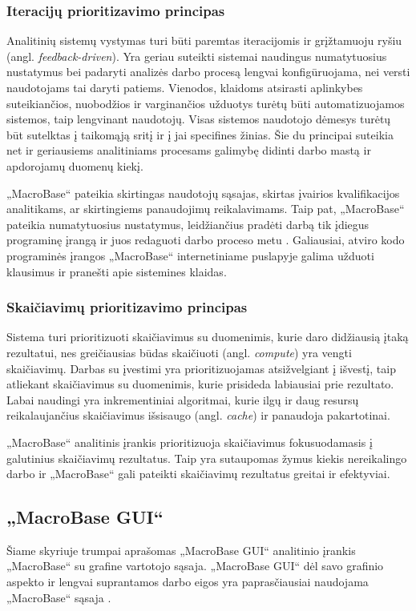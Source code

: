 \documentclass{VUMIFPSkursinis}
\begin{document}
\subsubsection{Iteracijų prioritizavimo principas}
Analitinių sistemų vystymas turi būti paremtas iteracijomis ir grįžtamuoju ryšiu (angl. \textit{feedback-driven}). Yra geriau  suteikti sistemai naudingus numatytuosius nustatymus bei padaryti analizės darbo procesą lengvai konfigūruojama, nei versti naudotojams tai daryti patiems. Vienodos, klaidoms atsirasti aplinkybes suteikiančios, nuobodžios ir varginančios užduotys turėtų būti automatizuojamos sistemos, taip lengvinant naudotojų. Visas sistemos naudotojo dėmesys turėtų būt sutelktas į taikomąją sritį ir į jai specifines žinias. Šie du principai suteikia net ir geriausiems analitiniams procesams galimybę didinti darbo mastą ir apdorojamų duomenų kiekį.\par

„MacroBase“ pateikia skirtingas naudotojų sąsajas, skirtas įvairios kvalifikacijos analitikams, ar skirtingiems panaudojimų reikalavimams. Taip pat, „MacroBase“ pateikia numatytuosius nustatymus, leidžiančius pradėti darbą tik įdiegus programinę įrangą ir juos redaguoti darbo proceso metu \cite{prioritizing_attention}. Galiausiai, atviro kodo programinės įrangos „MacroBase“ internetiniame puslapyje galima užduoti klausimus ir pranešti apie sistemines klaidas.

\subsubsection{Skaičiavimų prioritizavimo principas}
Sistema turi prioritizuoti skaičiavimus su duomenimis, kurie daro didžiausią įtaką rezultatui, nes greičiausias būdas skaičiuoti (angl. \textit{compute}) yra vengti skaičiavimų. Darbas su įvestimi yra prioritizuojamas atsižvelgiant į išvestį, taip atliekant skaičiavimus su duomenimis, kurie prisideda labiausiai prie rezultato. Labai naudingi yra inkrementiniai algoritmai, kurie ilgų ir daug resursų reikalaujančius skaičiavimus išsisaugo (angl. \textit{cache}) ir panaudoja pakartotinai.\par

„MacroBase“ analitinis įrankis prioritizuoja skaičiavimus fokusuodamasis į galutinius skaičiavimų rezultatus. Taip yra sutaupomas žymus kiekis nereikalingo darbo \cite{prioritizing_attention} ir „MacroBase“ gali pateikti skaičiavimų rezultatus greitai ir efektyviai.

\subsection{„MacroBase GUI“} \label{subsec:macrobase_gui}
Šiame skyriuje trumpai aprašomas „MacroBase GUI“ analitinio įrankis „MacroBase“ su grafine vartotojo sąsaja. „MacroBase GUI“ dėl savo grafinio aspekto ir lengvai suprantamos darbo eigos yra paprasčiausiai naudojama „MacroBase“ sąsaja \cite{macrobase_overview, prioritizing_attention}.\par
\end{document}

